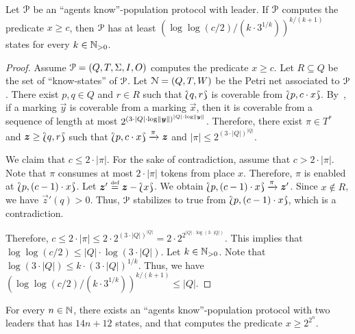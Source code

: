 \begin{theorem}
  Let $\mathcal{P}$ be an ``agents know''-population protocol with leader. If
  $\mathcal{P}$ computes the predicate $x \geq c$, then $\mathcal{P}$ has at least
  $(\log \log(c / 2) / (k \cdot 3^{1 / k}))^{k / (k + 1)}$ states for
  every $k \in \mathbb{N}_{>0}$. 
\end{theorem}

\begin{proof}
  Assume $\mathcal{P} = (Q, T, \Sigma, I, O)$ computes the predicate $x \geq
  c$. Let $R \subseteq Q$ be the set of ``know-states'' of $\mathcal{P}$. Let
  $\mathcal{N} = (Q, T, W)$ be the Petri net associated to $\mathcal{P}$. There exist
  $p, q \in Q$ and $r \in R$ such that $\Lbag q, r\Rbag$ is coverable
  from $\Lbag p, c \cdot x\Rbag$. By~\cite{Rac78}, if a marking
  $\vec{y}$ is coverable from a marking $\vec{x}$, then it is
  coverable from a sequence of length at most $2^{{(3 \cdot |Q| \cdot
      \log \lVert\bm{y}\rVert)}^{|Q| \cdot \log
      \lVert\bm{y}\rVert}}$. Therefore, there exist $\pi \in T^*$ and
  $\bm{z} \geq \Lbag q, r\Rbag$ such that $\Lbag p, c \cdot x\Rbag
  \xrightarrow{\pi} \bm{z}$ and $|\pi| \leq 2^{(3 \cdot |Q|)^{|Q|}}$.

  We claim that $c \leq 2 \cdot |\pi|$. For the sake of contradiction,
  assume that $c > 2 \cdot |\pi|$. Note that $\pi$ consumes at most $2
  \cdot |\pi|$ tokens from place $x$. Therefore, $\pi$ is enabled at
  $\Lbag p, (c - 1) \cdot x\Rbag$. Let $\bm{z}' \stackrel{\scriptscriptstyle\text{def}}{=} \bm{z} -
  \Lbag x\Rbag$. We obtain $\Lbag p, (c-1) \cdot x\Rbag \xrightarrow{\pi}
  \bm{z}'$. Since $x \not\in R$, we have $\vec{z}'(q) > 0$. Thus,
  $\mathcal{P}$ stabilizes to true from $\Lbag p, (c-1) \cdot x\Rbag$, which
  is a contradiction.

  Therefore, $c \leq 2 \cdot |\pi| \leq 2 \cdot 2^{(3 \cdot
    |Q|)^{|Q|}} = 2 \cdot 2^{2^{|Q| \cdot \log(3 \cdot |Q|)}}$. This
  implies that $\log \log (c / 2) \leq |Q| \cdot \log(3 \cdot
  |Q|)$. Let $k \in \mathbb{N}_{>0}$. Note that $\log(3 \cdot |Q|) \leq k
  \cdot (3 \cdot |Q|)^{1 / k}$. Thus, we have $(\log \log(c / 2) / (k
  \cdot 3^{1 / k}))^{k / (k + 1)} \leq |Q|$.
\end{proof}

\begin{theorem}
  For every $n \in \mathbb{N}$, there exists an ``agents know''-population
  protocol with two leaders that has $14n + 12$ states, and that
  computes the predicate $x \geq 2^{2^n}$.
\end{theorem}

